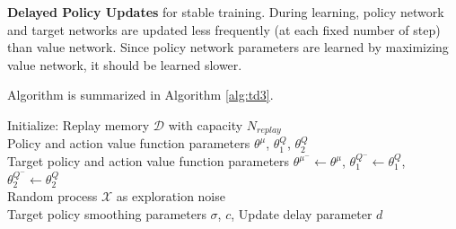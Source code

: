 \textbf{Delayed Policy Updates} for stable training. 
During learning, policy network and target networks are updated less frequently (at each fixed number of step) than value network. 
Since policy network parameters are learned by maximizing value network, it should be learned slower. 

Algorithm is summarized in Algorithm \ref{alg:td3}. 
\begin{algorithm}
	\SetAlgoLined
	\DontPrintSemicolon %
	Initialize: Replay memory $\mathcal{D}$ with capacity $N_{replay}$ \\
	Policy and action value function parameters $\theta^{\mu}$, $\theta^Q_1$, $\theta^Q_2$  \\
	Target policy and action value function parameters $\theta^{\mu^-} \leftarrow \theta^{\mu}$, $\theta^{Q^-}_1 \leftarrow \theta^{Q}_1$, $\theta^{Q^-}_2 \leftarrow \theta^{Q}_2$ \\
	Random process $\mathcal{X}$ as exploration noise \\
	Target policy smoothing parameters $\sigma$, $c$, Update delay parameter $d$ \\
\end{algorithm}
